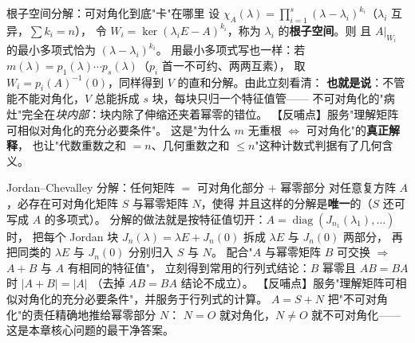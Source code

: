 \begin{fdeep}{根子空间分解：可对角化到底"卡"在哪里}
设 $\chi_A(\lambda)=\prod_{i=1}^{s}(\lambda-\lambda_i)^{k_i}$（$\lambda_i$ 互异，$\sum k_i=n$），
令 $W_i=\ker(\lambda_iE-A)^{k_i}$，称为 $\lambda_i$ 的\textbf{根子空间}。则
且 $A|_{W_i}$ 的最小多项式恰为 $(\lambda-\lambda_i)^{k_i}$。
用最小多项式写也一样：若 $m(\lambda)=p_1(\lambda)\cdots p_s(\lambda)$（$p_i$ 首一不可约、两两互素），
取 $W_i=p_i(A)^{-1}(0)$，同样得到 $V$ 的直和分解。由此立刻看清：
\textbf{也就是说}：不管能不能对角化，$V$ 总能拆成 $s$ 块，每块只归一个特征值管——
不可对角化的"病灶"完全在\emph{块内部}：块内除了伸缩还夹着幂零的错位。
【反哺点】服务"理解矩阵可相似对角化的充分必要条件"。
这是"为什么 $m$ 无重根 $\iff$ 可对角化"的\textbf{真正解释}，
也让"代数重数之和 $=n$、几何重数之和 $\le n$"这种计数式判据有了几何含义。
\end{fdeep}

\begin{fdeep}{Jordan--Chevalley 分解：任何矩阵 $=$ 可对角化部分 $+$ 幂零部分}
对任意复方阵 $A$，必存在可对角化矩阵 $S$ 与幂零矩阵 $N$，使得
并且这样的分解是\textbf{唯一}的（$S$ 还可写成 $A$ 的多项式）。
分解的做法就是按特征值切开：$A=\operatorname{diag}(J_{n_1}(\lambda_1),\dots)$ 时，
把每个 Jordan 块 $J_{n}(\lambda)=\lambda E+J_n(0)$ 拆成 $\lambda E$ 与 $J_n(0)$ 两部分，
再把同类的 $\lambda E$ 与 $J_n(0)$ 分别归入 $S$ 与 $N$。
配合"$A$ 与幂零矩阵 $B$ 可交换 $\Longrightarrow$ $A+B$ 与 $A$ 有相同的特征值"，
立刻得到常用的行列式结论：$B$ 幂零且 $AB=BA$ 时 $\lvert A+B\rvert=\lvert A\rvert$
（去掉 $AB=BA$ 结论不成立）。
【反哺点】服务"理解矩阵可相似对角化的充分必要条件"，并服务于行列式的计算。
$A=S+N$ 把"不可对角化"的责任精确地推给幂零部分 $N$：
$N=O$ 就对角化，$N\ne O$ 就不可对角化——这是本章核心问题的最干净答案。
\end{fdeep}

